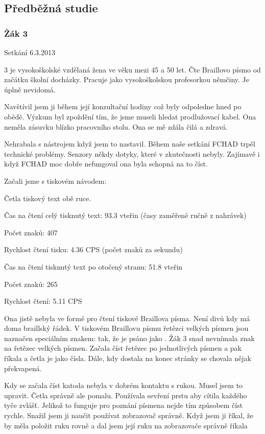 \subsection{Předběžná studie}



\subsubsection{Žák 3}

Setkání 6.3.2013

 3 je vysokoškolské vzdělaná žena ve věku mezi 45 a 50 let. Čte Braillovo písmo od začátku školní docházky.  Pracuje jako vysokoškolskou profesorkou němčiny.  Je úplně nevidomá.

Navštívil jsem ji během její konzultační hodiny což byly odpoledne hned po obědě.  Výzkum byl zpoždění tím, že jsme museli hledat prodlužovací kabel. Ona neměla zásuvku blízko pracovního stolu.  Ona se mě zdála čilá a zdravá.

Nehrabala s nástrojem když jsem to nastavil. Během naše setkání FCHAD trpěl technické problémy. Senzory někdy  dotyky, které v zkutečnosti nebyly.  Zajímavě i když FCHAD moc dobře nefungoval ona byla schopná na to číst.

Začali jsme s tiskovém návodem:

Četla tiskový text obě ruce.

Čas na čtení celý tisknutý text: 93.3 vteřin (časy zaměřené ručně z nahrávek)

Počet znaků: 407

Rychlost čtení tisku: 4.36 CPS (počet znaků za sekundu)

Čas na čtení tisknutý text po otočený stranu: 51.8 vteřin

Počet znaků: 265

Rychlost čtení: 5.11 CPS

Ona jistě nebyla ve formě pro čtení tiskové Braillova písma.  Není divů kdy má doma braillský řádek.  V tiskovém Braillovu písmu řetězci velkých písmen jsou naznačen speciálním znakem:  tak, že  je psáno jako . Žák 3 snad nevnímala znak na řetězec velkých písmen.  Začala číst řetězec po jednotlivých písmen a pak říkala  a četla je jako čísla.  Dále, kdy dostala na konec stránky se chovala nějak překvapená.

Kdy se začala číst katoda nebyla v dobrém kontaktu s rukou.  Musel jsem to upravit.  Četla správně ale pomalu. Používala sevření prstu aby cítila každého tyče zvlášť.  Jelikož to funguje pro poznání písmena nejde tím způsobem číst rychle. Snažil jsem ji naučit používat zobrazovač správně.  Když jsem ji říkal, že by měla položit ruku rovně a dal jsem její ruku na zobrazovače správně říkala  %

